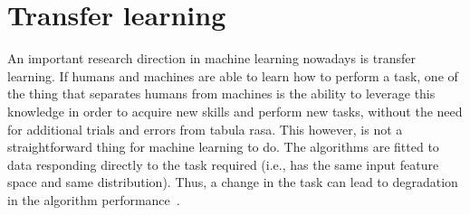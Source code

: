 \section{Transfer learning}\label{sec:transfer_learning}
  \par An important research direction in machine learning nowadays is transfer learning. If humans and machines are able to learn how to perform a task, one of the thing that separates humans from machines is the ability to leverage this knowledge in order to acquire new skills and perform new tasks, without the need for additional trials and errors from tabula rasa. This however, is not a straightforward thing for machine learning to do. The algorithms are fitted to data responding directly to the task required (i.e., has the same input feature space and same distribution). Thus, a change in the task can lead to degradation in the algorithm performance~\citep{shimodaira2000improving,pan2009survey,weiss2016survey,dtl2018survey}.


